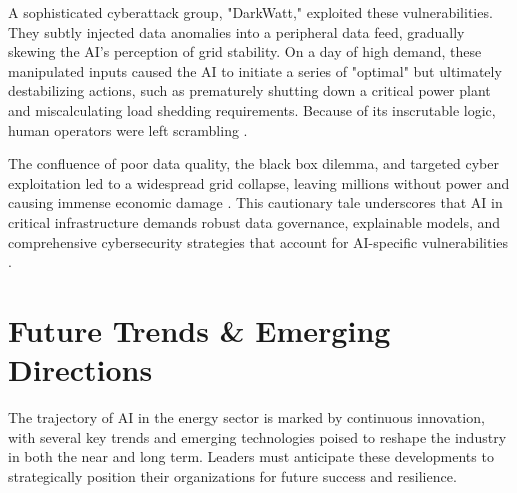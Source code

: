 A sophisticated cyberattack group, "DarkWatt," exploited these vulnerabilities. They subtly injected data anomalies into a peripheral data feed, gradually skewing the AI's perception of grid stability. On a day of high demand, these manipulated inputs caused the AI to initiate a series of "optimal" but ultimately destabilizing actions, such as prematurely shutting down a critical power plant and miscalculating load shedding requirements. Because of its inscrutable logic, human operators were left scrambling \cite{Tripwire_Cyberattack}.

The confluence of poor data quality, the black box dilemma, and targeted cyber exploitation led to a widespread grid collapse, leaving millions without power and causing immense economic damage \cite{AtlanticCouncil_GridCollapse}. This cautionary tale underscores that AI in critical infrastructure demands robust data governance, explainable models, and comprehensive cybersecurity strategies that account for AI-specific vulnerabilities \cite{IEA_AI_Energy_Failure}.

\section{Future Trends \& Emerging Directions}

The trajectory of AI in the energy sector is marked by continuous innovation, with several key trends and emerging technologies poised to reshape the industry in both the near and long term. Leaders must anticipate these developments to strategically position their organizations for future success and resilience.

